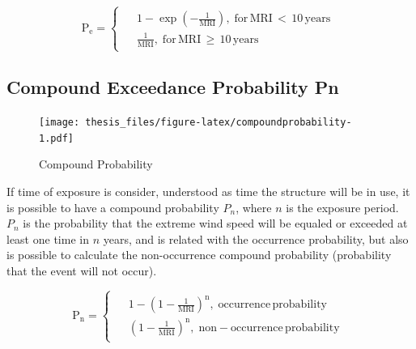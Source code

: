 \documentclass[12pt,oneside]{reedthesis}
\begin{document}
\[
  \mathrm{
    P_e = 
    \begin{cases}
      \begin{split}
            &1-\exp\left(-\frac{1}{MRI}\right),\;for\,MRI\,<\,10\,years
            \\
            &\frac{1}{MRI},\;for\,MRI\,\geq\,10\,years      
      \end{split}
    \end{cases}
  }
\]

\hypertarget{compound-exceedance-probability-pn}{%
\subsection{Compound Exceedance Probability Pn}\label{compound-exceedance-probability-pn}}

\footnotesize
\begin{figure}
\centering
\texttt{[image: thesis\_files/figure-latex/compoundprobability-1.pdf]}
\caption{\label{fig:compoundprobability}Compound Probability}
\end{figure}
\normalsize

If time of exposure is consider, understood as time the structure will be in use, it is possible to have a compound probability \(P_n\), where \(n\) is the exposure period. \(P_n\) is the probability that the extreme wind speed will be equaled or exceeded at least one time in \(n\) years, and is related with the occurrence probability, but also is possible to calculate the non-occurrence compound probability (probability that the event will not occur).

\[
  \mathrm{
    P_n = 
    \begin{cases}
      \begin{split}
            &1-\left(1-\frac{1}{MRI}\right)^n,\;occurrence\,probability
            \\
            &\left(1-\frac{1}{MRI}\right)^n,\;non-occurrence\,probability
      \end{split}
    \end{cases}
  }
\]
\end{document}
